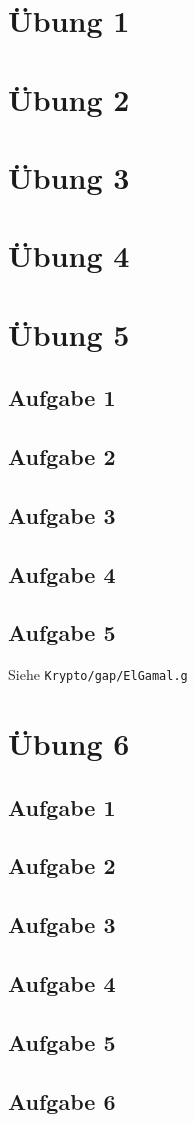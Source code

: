 \documentclass[a4paper,12pt,twoside]{article}
\theoremstyle{definition}
\begin{document}
\section{Übung 1}
\section{Übung 2}
\section{Übung 3}
\section{Übung 4}
\newpage

\section{Übung 5}
\subsection{Aufgabe 1}
\subsection{Aufgabe 2}
\subsection{Aufgabe 3}
\subsection{Aufgabe 4}
\subsection{Aufgabe 5}
Siehe \texttt{Krypto/gap/ElGamal.g}
\newpage
\section{Übung 6}
\subsection{Aufgabe 1}
\subsection{Aufgabe 2}

\subsection{Aufgabe 3}

\subsection{Aufgabe 4}

\subsection{Aufgabe 5}

\subsection{Aufgabe 6}

\end{document}
